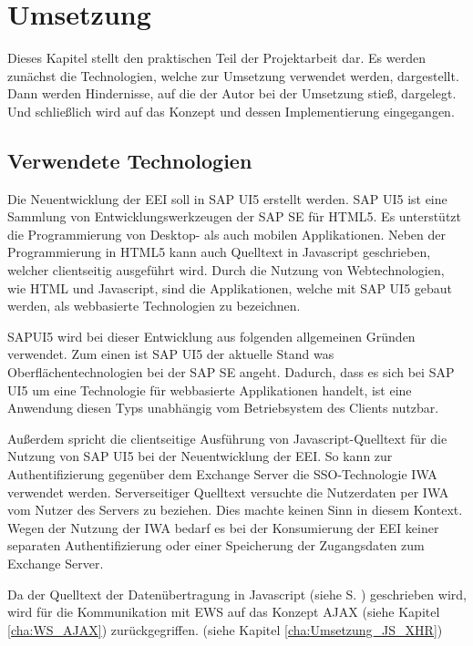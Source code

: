 \chapter{Umsetzung}
\label{cha:Umsetzung}
Dieses Kapitel stellt den praktischen Teil der Projektarbeit dar. Es werden zunächst die Technologien, welche zur Umsetzung verwendet werden, dargestellt. Dann werden Hindernisse, auf die der Autor bei der Umsetzung stieß, dargelegt. Und schließlich wird auf das Konzept und dessen Implementierung eingegangen.

\section{Verwendete Technologien}
\label{sec:Umsetzung_usedtech}
Die Neuentwicklung der \ac{EEI} soll in SAP UI5 erstellt werden. SAP UI5 ist eine Sammlung von Entwicklungswerkzeugen der SAP SE für HTML5. Es unterstützt die Programmierung von Desktop- als auch mobilen Applikationen. Neben der Programmierung in HTML5 kann auch Quelltext in Javascript geschrieben, welcher clientseitig ausgeführt wird. \cite[S. 5]{SAPSE.2015} Durch die Nutzung von Webtechnologien, wie HTML und Javascript, sind die Applikationen, welche mit SAP UI5 gebaut werden, als webbasierte Technologien zu bezeichnen.

SAPUI5 wird bei dieser Entwicklung aus folgenden allgemeinen Gründen verwendet. Zum einen ist SAP UI5 der aktuelle Stand was Oberflächentechnologien bei der SAP SE angeht. Dadurch, dass es sich bei SAP UI5 um eine Technologie für webbasierte Applikationen handelt, ist eine Anwendung diesen Typs unabhängig vom Betriebsystem des Clients nutzbar. 

Außerdem spricht die clientseitige Ausführung von Javascript-Quelltext für die Nutzung von SAP UI5 bei der Neuentwicklung der \ac{EEI}. So kann zur Authentifizierung gegenüber dem Exchange Server die \ac{SSO}-Technologie \ac{IWA} verwendet werden. Serverseitiger Quelltext versuchte die Nutzerdaten per \ac{IWA} vom Nutzer des Servers zu beziehen. Dies machte keinen Sinn in diesem Kontext.
Wegen der Nutzung der \ac{IWA} bedarf es bei der Konsumierung der \ac{EEI} keiner separaten Authentifizierung oder einer Speicherung der Zugangsdaten zum Exchange Server.

Da der Quelltext der Datenübertragung in Javascript (siehe S. \pageref{cha:Beigaben}) geschrieben wird, wird für die Kommunikation mit \ac{EWS} auf das Konzept \ac{AJAX} (siehe Kapitel \ref{cha:WS_AJAX}) zurückgegriffen. (siehe Kapitel \ref{cha:Umsetzung_JS_XHR})

